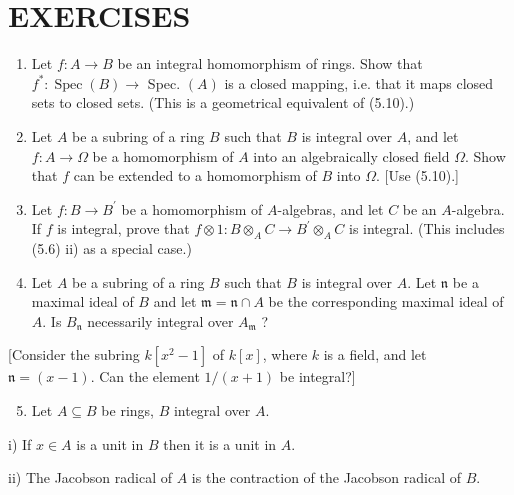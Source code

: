 \documentclass{standalone}
\theoremstyle{definition}
\theoremstyle{remark}
\begin{document}
\section{EXERCISES}
\begin{enumerate}
  \item Let $f: A \rightarrow B$ be an integral homomorphism of rings. Show that $f^{*}: \operatorname{Spec}(B) \rightarrow$ Spec. $(A)$ is a closed mapping, i.e. that it maps closed sets to closed sets. (This is a geometrical equivalent of (5.10).)

  \item Let $A$ be a subring of a ring $B$ such that $B$ is integral over $A$, and let $f: A \rightarrow \Omega$ be a homomorphism of $A$ into an algebraically closed field $\Omega$. Show that $f$ can be extended to a homomorphism of $B$ into $\Omega$. [Use (5.10).]

  \item Let $f: B \rightarrow B^{\prime}$ be a homomorphism of $A$-algebras, and let $C$ be an $A$-algebra. If $f$ is integral, prove that $f \otimes 1: B \otimes_{A} C \rightarrow B^{\prime} \otimes_{A} C$ is integral. (This includes (5.6) ii) as a special case.)

  \item Let $A$ be a subring of a ring $B$ such that $B$ is integral over $A$. Let $\mathfrak{n}$ be a maximal ideal of $B$ and let $\mathfrak{m}=\mathfrak{n} \cap A$ be the corresponding maximal ideal of $A$. Is $B_{\mathfrak{n}}$ necessarily integral over $A_{\mathfrak{m}}$ ?

\end{enumerate}

[Consider the subring $k\left[x^{2}-1\right]$ of $k[x]$, where $k$ is a field, and let $\mathfrak{n}=(x-1)$. Can the element $1 /(x+1)$ be integral?]

\begin{enumerate}
  \setcounter{enumi}{4}
  \item Let $A \subseteq B$ be rings, $B$ integral over $A$.
\end{enumerate}

i) If $x \in A$ is a unit in $B$ then it is a unit in $A$.

ii) The Jacobson radical of $A$ is the contraction of the Jacobson radical of $B$.
\end{document}
